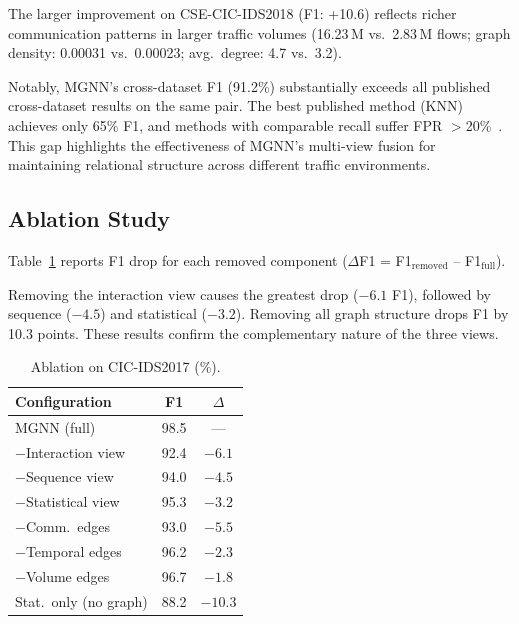 \documentclass[conference]{IEEEtran}
\newcommand{\MGNN}{\textsc{MGNN}}
\begin{document}
The larger improvement on CSE-CIC-IDS2018 (F1: +10.6) reflects richer communication patterns in larger traffic volumes (16.23\,M vs.\ 2.83\,M flows; graph density: 0.00031 vs.\ 0.00023; avg.\ degree: 4.7 vs.\ 3.2).

Notably, MGNN's cross-dataset F1 (91.2\%) substantially exceeds all published cross-dataset results on the same pair. The best published method (KNN) achieves only 65\% F1, and methods with comparable recall suffer FPR $>$20\%~\cite{sarhan2023cross}. This gap highlights the effectiveness of MGNN's multi-view fusion for maintaining relational structure across different traffic environments.

\subsection{Ablation Study}
Table~\ref{tab:ablation_view} reports F1 drop for each removed component ($\Delta$F1 = F1$_{\text{removed}}$ -- F1$_{\text{full}}$).

Removing the interaction view causes the greatest drop ($-6.1$ F1), followed by sequence ($-4.5$) and statistical ($-3.2$). Removing all graph structure drops F1 by 10.3 points. These results confirm the complementary nature of the three views.

\begin{table}[t]
\caption{Ablation on CIC-IDS2017 (\%).}
\label{tab:ablation_view}
\centering
\scriptsize

\begin{tabular}{lcc}
\toprule
Configuration & F1 & $\Delta$ \\

\midrule
\MGNN{} (full) & 98.5 & --- \\

\quad $-$Interaction view & 92.4 & $-6.1$ \\

\quad $-$Sequence view & 94.0 & $-4.5$ \\

\quad $-$Statistical view & 95.3 & $-3.2$ \\

\quad $-$Comm.\ edges & 93.0 & $-5.5$ \\

\quad $-$Temporal edges & 96.2 & $-2.3$ \\

\quad $-$Volume edges & 96.7 & $-1.8$ \\

\quad Stat.\ only (no graph) & 88.2 & $-10.3$ \\

\bottomrule
\end{tabular}

\end{table}
\end{document}
